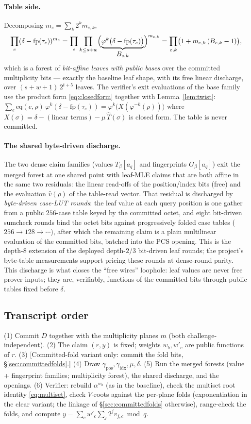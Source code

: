 \documentclass[11pt]{article}
\theoremstyle{definition}
\newcommand{\eq}{\mathrm{eq}}
\newcommand{\fp}{\mathrm{fp}}
\newcommand{\mhat}[1]{\widehat{#1}}
\begin{document}
\paragraph{Table side.}
Decomposing $m_e=\sum_k 2^k m_{e,k}$,
\[
\prod_e (\delta-\fp(\tau_e))^{m_e}
= \prod_{e}\prod_{k\le s+w}
\Bigl(\underbrace{\varphi^k\bigl(\delta-\fp(\tau_e)\bigr)}_{\textstyle
B_{e,k}}\Bigr)^{m_{e,k}}
= \prod_{e,k}\bigl(1 + m_{e,k}\,(B_{e,k}-1)\bigr),
\]
which is a forest of \emph{bit-affine leaves with public bases} over the
committed multiplicity bits --- exactly the baseline leaf shape, with its
free linear discharge, over $(s{+}w{+}1)\,2^{t+5}$ leaves. The verifier's
exit evaluations of the base family use the product form
\eqref{eq:closedform} together with Lemma~\ref{lem:twist}:
$\sum_e \eq(e,\rho)\,\varphi^k(\delta-\fp(\tau_e))
= \varphi^k\bigl(X(\varphi^{-k}(\rho))\bigr)$ where
$X(\sigma)=\delta-(\text{linear terms})-\mu\,\mhat T(\sigma)$ is closed
form. The table is never committed.

\paragraph{The shared byte-driven discharge.}
The two dense claim families (values $T_\beta[a_q]$ and fingerprints
$G_\beta[a_q]$) exit the merged forest at one shared point with leaf-MLE
claims that are both affine in the same two residuals: the linear
read-offs of the position/index bits (free) and the evaluation
$\mhat{v}(\rho)$ of the table-read vector. That residual is discharged by
\emph{byte-driven case-LUT rounds}: the leaf value at each query position
is one gather from a public $256$-case table keyed by the committed
octet, and eight bit-driven sumcheck rounds bind the octet bits against
progressively folded case tables ($256\to 128\to\cdots$), after which the
remaining claim is a plain multilinear evaluation of the committed bits,
batched into the PCS opening. This is the depth-$8$ extension of the
deployed depth-$2$/$3$ bit-driven leaf rounds; the project's byte-table
measurements support pricing these rounds at dense-round parity. This
discharge is what closes the ``free wires'' loophole: leaf values are
never free prover inputs; they are, verifiably, functions of the
committed bits through public tables fixed before $\delta$.

\subsection{Transcript order}\label{sec:fs}
(1) Commit $D$ together with the multiplicity planes $m$ (both
challenge-independent). (2) The claim $(r,y)$ is fixed; weights
$w_b, w'_c$ are public functions of $r$. (3) [Committed-fold variant
only: commit the fold bits, \S\ref{sec:committedfolds}.] (4) Draw
$\gamma_{\mathrm{pos}},\gamma_{\mathrm{idx}},\mu,\delta$. (5) Run the
merged forests (value + fingerprint families; multiplicity forest),
the shared discharge, and the openings. (6) Verifier: rebuild
$\alpha^{w_b}$ (as in the baseline), check the multiset root identity
\eqref{eq:multiset}, check $V$-roots against the per-plane folds
(exponentiation in the clear variant; the linkage of
\S\ref{sec:committedfolds} otherwise), range-check the folds, and
compute $y=\sum_c w'_c\sum_j 2^j v_{j,c}\bmod q$.
\end{document}
